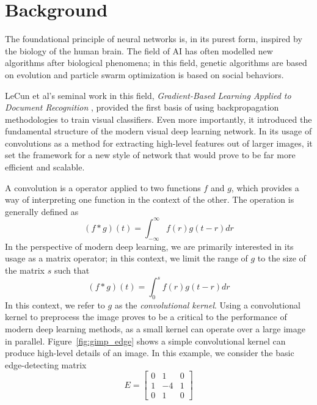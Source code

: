 \chapter{Background}

The foundational principle of neural networks is, in its purest form, inspired by the biology of the human brain.
The field of AI has often modelled new algorithms after biological phenomena; in this field, genetic algorithms are based on evolution and particle swarm optimization is based on social behaviors.


LeCun et al's seminal work in this field, \emph{Gradient-Based Learning Applied to Document Recognition} \cite{lecun1998gradient}, provided the first basis of using backpropagation methodologies to train visual classifiers.
Even more importantly, it introduced the fundamental structure of the modern visual deep learning network.
In its usage of convolutions as a method for extracting high-level features out of larger images, it set the framework for a new style of network that would prove to be far more efficient and scalable.

A convolution is a operator applied to two functions $f$ and $g$, which provides a way of interpreting one function in the context of the other.
The operation is generally defined as
\[(f * g)(t) = \int_{-\infty}^\infty f(r)g(t-r) dr\]
In the perspective of modern deep learning, we are primarily interested in its usage as a matrix operator; in this context, we limit the range of $g$ to the size of the matrix $s$ such that
\[(f * g)(t) = \int_0^s f(r)g(t-r) dr\]
In this context, we refer to $g$ as the \emph{convolutional kernel}.
Using a convolutional kernel to preprocess the image proves to be a critical to the performance of modern deep learning methods, as a small kernel can operate over a large image in parallel.
Figure~\ref{fig:gimp_edge} shows a simple convolutional kernel can produce high-level details of an image.
In this example, we consider the basic edge-detecting matrix 
\[E = \begin{bmatrix} 0 & 1 & 0 \\ 1 & -4 & 1 \\ 0 & 1 & 0\end{bmatrix}\]



